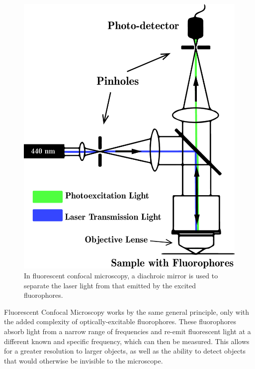 \begin{figure}
	
	\centering
\includegraphics[width=\linewidth]{Chapters/Figures/confocal_fluorescent_diagram_b}
\caption[Fluorescent Confocal Microscopy]{In fluorescent confocal microscopy, a diachroic mirror is used to separate the laser light from that emitted by the excited fluorophores. }
\label{fig:confocalfluorescentdiagram}
	
	
\end{figure}
	
Fluorescent Confocal Microscopy works by the same general principle, only with the added complexity of optically-excitable fluorophores. These fluorophores absorb light from a narrow range of frequencies and re-emit fluorescent light at a different known and specific frequency, which can then be measured. This allows for a greater resolution to larger objects, as well as the ability to detect objects that would otherwise be invisible to the microscope.  

